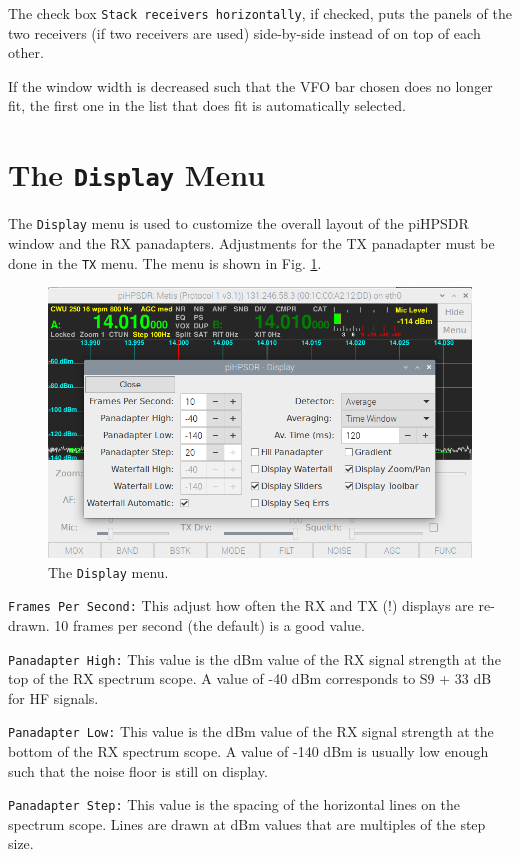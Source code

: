 \documentclass[12pt]{book}
\def\rett#1{\texttt{\color{red}#1}}
\def\bltt#1{\texttt{\color{blue}#1}}
\begin{document}
The check box \rett{Stack receivers horizontally}, if checked, puts the panels
of the two receivers (if two receivers are used) side-by-side instead of on top
of each other.

If the window width is decreased such that the VFO bar chosen does no longer fit,
the first one in the list that does fit is automatically selected. 

\section{The \texttt{Display} Menu}

The \bltt{Display} menu is used to customize the overall layout of the piHPSDR
window and the RX panadapters. Adjustments
for the TX panadapter must be done in the \bltt{TX} menu. The menu is shown
in Fig. \ref{fig:DisplayMenu}.

\begin{figure}[h]
\center
\includegraphics[width=12cm]{DisplayMenu.png}
\caption{The \bltt{Display} menu.}
\label{fig:DisplayMenu}
\end{figure}

\rett{Frames Per Second:} This adjust how often the RX and TX (!) displays are re-drawn.
10 frames per second (the default) is a good value.

\rett{Panadapter High:} This value is the dBm value of the RX signal strength at the
top of the RX spectrum scope. A value of -40 dBm corresponds to S9 + 33 dB for HF
signals.

\rett{Panadapter Low:} This value is the dBm value of the RX signal strength at the
bottom of the RX spectrum scope. A value of -140 dBm is usually low enough such that
the noise floor is still on display.

\rett{Panadapter Step:} This value is the spacing of the horizontal lines on 
the spectrum scope. Lines are drawn at dBm values that are multiples of the step
size.
\end{document}

